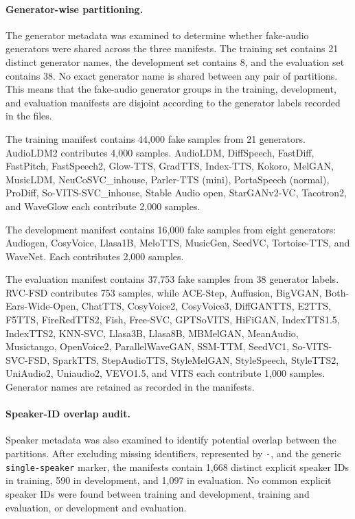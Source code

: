 \documentclass[12pt,a4paper]{report}
\begin{document}
\paragraph{Generator-wise partitioning.} The generator metadata was examined to determine whether fake-audio generators were shared across the three manifests. The training set contains 21 distinct generator names, the development set contains 8, and the evaluation set contains 38. No exact generator name is shared between any pair of partitions. This means that the fake-audio generator groups in the training, development, and evaluation manifests are disjoint according to the generator labels recorded in the files.

The training manifest contains 44,000 fake samples from 21 generators. AudioLDM2 contributes 4,000 samples. AudioLDM, DiffSpeech, FastDiff, FastPitch, FastSpeech2, Glow-TTS, GradTTS, Index-TTS, Kokoro, MelGAN, MusicLDM, NeuCoSVC\_inhouse, Parler-TTS (mini), PortaSpeech (normal), ProDiff, So-VITS-SVC\_inhouse, Stable Audio open, StarGANv2-VC, Tacotron2, and WaveGlow each contribute 2,000 samples.

The development manifest contains 16,000 fake samples from eight generators: Audiogen, CosyVoice, Llasa1B, MeloTTS, MusicGen, SeedVC, Tortoise-TTS, and WaveNet. Each contributes 2,000 samples.

The evaluation manifest contains 37,753 fake samples from 38 generator labels. RVC-FSD contributes 753 samples, while ACE-Step, Auffusion, BigVGAN, Both-Ears-Wide-Open, ChatTTS, CosyVoice2, CosyVoice3, DiffGANTTS, E2TTS, F5TTS, FireRedTTS2, Fish, Free-SVC, GPTSoVITS, HiFiGAN, IndexTTS1.5, IndexTTS2, KNN-SVC, Llasa3B, Llasa8B, MBMelGAN, MeanAudio, Musictango, OpenVoice2, ParallelWaveGAN, SSM-TTM, SeedVC1, So-VITS-SVC-FSD, SparkTTS, StepAudioTTS, StyleMelGAN, StyleSpeech, StyleTTS2, UniAudio2, Uniaudio2, VEVO1.5, and VITS each contribute 1,000 samples. Generator names are retained as recorded in the manifests.

\paragraph{Speaker-ID overlap audit.} Speaker metadata was also examined to identify potential overlap between the partitions. After excluding missing identifiers, represented by \texttt{-}, and the generic \texttt{single-speaker} marker, the manifests contain 1,668 distinct explicit speaker IDs in training, 590 in development, and 1,097 in evaluation. No common explicit speaker IDs were found between training and development, training and evaluation, or development and evaluation.
\end{document}
